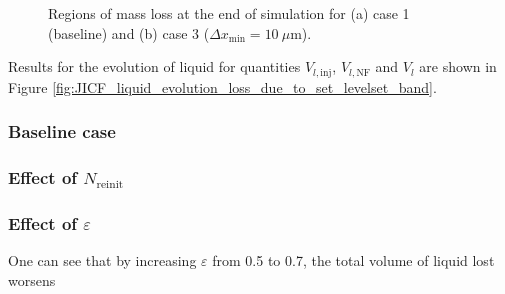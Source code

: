 \begin{figure}[h!]
	\centering
	\caption{Regions of mass loss at the end of simulation for (a) case 1 (baseline) and (b) case 3 ($\Delta x_\mathrm{min} = 10~\mu$m).}	\label{fig:jicf_mass_loss_baseline_and_dx10}
\end{figure}

Results for the evolution of liquid for quantities $V_{l,\mathrm{inj}}$, $V_{l,\mathrm{NF}}$ and $V_l$ are shown in Figure \ref{fig:JICF_liquid_evolution_loss_due_to_set_levelset_band}.




\subsubsection*{Baseline case}


\subsubsection*{Effect of $N_\mathrm{reinit}$}


\subsubsection*{Effect of $\varepsilon$}

One can see that by increasing $\varepsilon$ from 0.5 to 0.7, the total volume of liquid lost worsens

\clearpage

